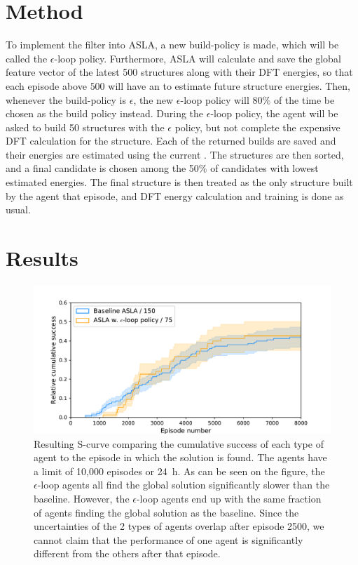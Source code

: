 \section{Method}
To implement the filter into ASLA, a new build-policy is made, which will be called the $\epsilon$-loop policy. Furthermore, ASLA will calculate and save the global feature vector of the latest 500 structures along with their DFT energies, so that each episode above $500$ will have an \bm{$\varepsilon$} to estimate future structure energies. Then, whenever the build-policy is $\epsilon$, the new $\epsilon$-loop policy will $80\%$ of the time be chosen as the build policy instead. During the $\epsilon$-loop policy, the agent will be asked to build 50 structures with the $\epsilon$ policy, but not complete the expensive DFT calculation for the structure. Each of the returned builds are saved and their energies are estimated using the current \bm{$\varepsilon$}. The structures are then sorted, and a final candidate is chosen among the 50\% of candidates with lowest estimated energies. The final structure is then treated as the only structure built by the agent that episode, and DFT energy calculation and training is done as usual.

\section{Results}
\begin{figure}
	\centering
	\includegraphics[width=\columnwidth]{graphics/S_curve.pdf}
	\captionsetup{width=1.3\columnwidth}
	\caption{Resulting S-curve comparing the cumulative success of each type of agent to the episode in which the solution is found. The agents have a limit of 10,000 episodes or \SI{24}{\hour}. As can be seen on the figure, the $\epsilon$-loop agents all find the global solution significantly slower than the baseline. However, the $\epsilon$-loop agents end up with the same fraction of agents finding the global solution as the baseline. Since the uncertainties of the 2 types of agents overlap after episode 2500, we cannot claim that the performance of one agent is significantly different from the others after that episode.}
	\label{fig:S-curve}
\end{figure}

